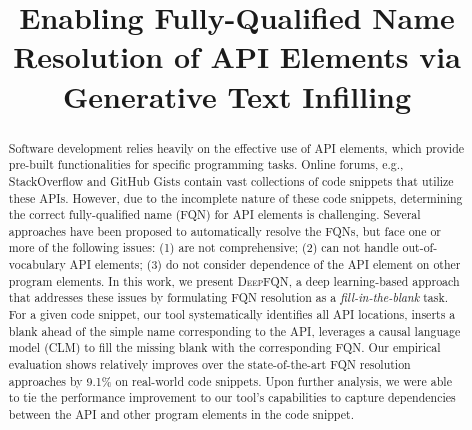 \documentclass[conference]{IEEEtran}
\newcommand{\tool}{\textsc{DeepFQN}\xspace}
\begin{document}


\title{Enabling Fully-Qualified Name Resolution of API Elements via Generative Text Infilling}


\maketitle

\begin{abstract}

Software development relies heavily on the effective use of API elements, which provide pre-built functionalities for specific programming tasks. Online forums, e.g., StackOverflow and GitHub Gists contain vast collections of code snippets that utilize these APIs. However, due to the incomplete nature of these code snippets, determining the correct fully-qualified name (FQN) for API elements is challenging. Several approaches have been proposed to automatically resolve the FQNs, but face one or more of the following issues: (1) are not comprehensive; (2) can not handle out-of-vocabulary API elements; (3) do not consider dependence of the API element on other program elements. In this work, we  present {\tool}, a deep learning-based approach that addresses these issues by formulating FQN resolution as a \textit{fill-in-the-blank} task. For a given code snippet, our tool systematically identifies all API locations, inserts a blank ahead of the simple name corresponding to the API, leverages a causal language model (CLM) to fill the missing blank with the corresponding FQN.
Our empirical evaluation shows relatively improves over the state-of-the-art FQN resolution approaches by 9.1\% on real-world code snippets. Upon further analysis, we were able to tie the performance improvement to our tool's capabilities to capture dependencies between the API and other program elements in the code snippet.  

\end{abstract}
\end{document}

